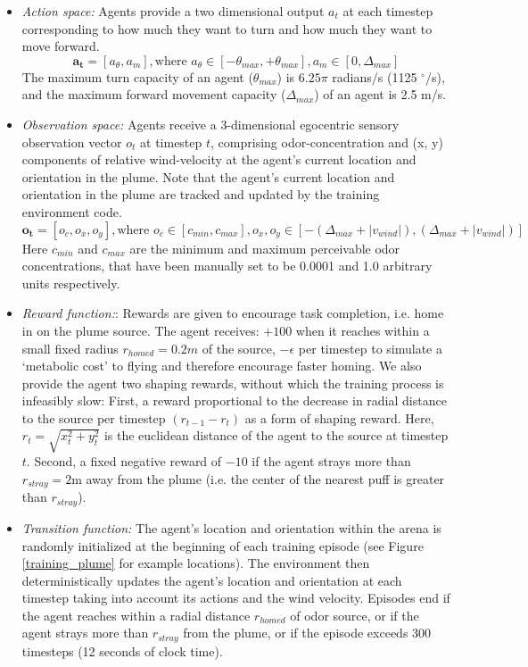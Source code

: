 \documentclass[5p,twocolumn,authoryear]{elsarticle}
\begin{document}
\begin{itemize}
    \item 
    \textit{Action space:} Agents provide a two dimensional output $a_t$ at each timestep corresponding to how much they want to turn and how much they want to move forward.
    $$ \mathbf{a_t} = [a_{\theta}, a_m], \text{where } a_{\theta} \in [-\theta_{max}, +\theta_{max}], a_m \in [0, \Delta_{max}]$$ 
    The maximum turn capacity of an agent ($\theta_{max}$) is $6.25\pi$ radians/s (1125 $^\circ$/s), and the maximum forward movement capacity ($\Delta_{max}$) of an agent is 2.5 m/s.
    
    \item 
    \textit{Observation space:} Agents receive a 3-dimensional egocentric sensory observation vector $o_t$ at timestep $t$, comprising odor-concentration and (x, y) components of relative wind-velocity at the agent's current location and orientation in the plume.
    Note that the agent's current location and orientation in the plume are tracked and updated by the training environment code. 
    $$ \mathbf{o_t} = [o_c, o_x, o_y], \text{where } o_c \in [c_{min}, c_{max}], o_x,o_y \in [-(\Delta_{max} + |v_{wind}|), (\Delta_{max} + |v_{wind}|)]$$ 
    Here $c_{min}$ and $c_{max}$ are the minimum and maximum perceivable odor concentrations, that have been manually set to be 0.0001 and 1.0 arbitrary units respectively. 

    \item 
    \textit{Reward function:}:
    Rewards are given to encourage task completion, i.e. home in on the plume source.
    The agent receives:
    $+100$ when it reaches within a small fixed radius $r_{homed} = 0.2m$ of the source, 
    $-\epsilon$ per timestep to simulate a `metabolic cost' to flying and therefore encourage faster homing.
    We also provide the agent two shaping rewards, without which the training process is infeasibly slow:
    First, a reward proportional to the decrease in radial distance to the source per timestep $(r_{t-1} - r_{t})$ as a form of shaping reward.
    Here, $r_{t} = \sqrt{x_t^2 + y_t^2}$ is the euclidean distance of the agent to the source at timestep $t$.
    Second, a fixed negative reward of $-10$ if the agent strays more than $r_{stray} = 2$m away from the plume (i.e. the center of the nearest puff is greater than $r_{stray}$). 
    
    \item 
    \textit{Transition function:} 
    The agent's location and orientation within the arena is randomly initialized at the beginning of each training episode (see Figure \ref{training_plume} for example locations).
    The environment then deterministically updates the agent's location and orientation at each timestep taking into account its actions and the wind velocity. 
    Episodes end if the agent reaches within a radial distance $r_{homed}$ of odor source, or if the agent strays more than $r_{stray}$ from the plume, or if the episode exceeds 300 timesteps (12 seconds of clock time).
    

\end{itemize}
\end{document}
